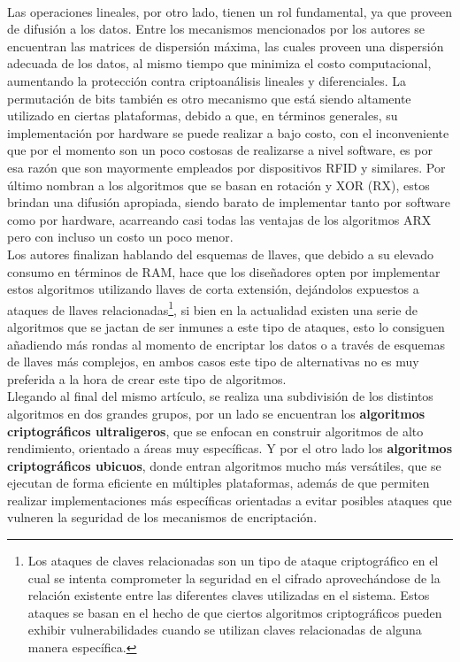 \documentclass[]{article}
\begin{document}
\\ Las operaciones lineales, por otro lado, tienen un rol fundamental, ya que proveen de difusión a los datos. Entre los mecanismos mencionados por los autores se encuentran las matrices de dispersión máxima, las cuales proveen una dispersión adecuada de los datos, al mismo tiempo que minimiza el costo computacional, aumentando la protección contra criptoanálisis lineales y diferenciales. La permutación de bits también es otro mecanismo que está siendo altamente utilizado en ciertas plataformas, debido a que, en términos generales, su implementación por hardware se puede realizar a bajo costo, con el inconveniente que por el momento son un poco costosas de realizarse a nivel software, es por esa razón que son mayormente empleados por dispositivos RFID y similares. Por último nombran a los algoritmos que se basan en rotación y XOR (RX), estos brindan una difusión apropiada, siendo barato de implementar tanto por software como por hardware, acarreando casi todas las ventajas de los algoritmos ARX pero con incluso un costo un poco menor.
\\ Los autores finalizan hablando del esquemas de llaves, que debido a su elevado consumo en términos de RAM, hace que los diseñadores opten por implementar estos algoritmos utilizando llaves de corta extensión, dejándolos expuestos a ataques de llaves relacionadas\footnote{Los ataques de claves relacionadas son un tipo de ataque criptográfico en el cual se intenta comprometer la seguridad en el cifrado aprovechándose de la relación existente entre las diferentes claves utilizadas en el sistema. Estos ataques se basan en el hecho de que ciertos algoritmos criptográficos pueden exhibir vulnerabilidades cuando se utilizan claves relacionadas de alguna manera específica.}, si bien en la actualidad existen una serie de algoritmos que se jactan de ser inmunes a este tipo de ataques, esto lo consiguen añadiendo más rondas al momento de encriptar los datos o a través de esquemas de llaves más complejos, en ambos casos este tipo de alternativas no es muy preferida a la hora de crear este tipo de algoritmos.
\\Llegando al final del mismo artículo, se realiza una subdivisión de los distintos algoritmos en dos grandes grupos, por un lado se encuentran los \textbf{algoritmos criptográficos ultraligeros}, que se enfocan en construir algoritmos de alto rendimiento, orientado a áreas muy específicas. Y por el otro lado los \textbf{algoritmos criptográficos ubicuos}, donde entran algoritmos mucho más versátiles, que se ejecutan de forma eficiente en múltiples plataformas, además de que permiten realizar implementaciones más específicas orientadas a evitar posibles ataques que vulneren la seguridad de los mecanismos de encriptación.
\printbibliography
\end{document}
